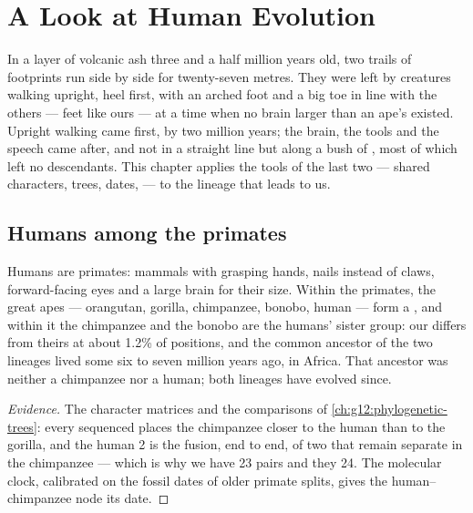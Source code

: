 \chapter{A Look at Human Evolution}\label{ch:g12:human-evolution}

In a layer of volcanic ash three and a half million years old, two
trails of footprints run side by side for twenty-seven metres. They
were left by creatures walking upright, heel first, with an arched foot
and a big toe in line with the others --- feet like ours --- at a time
when no brain larger than an ape's existed. Upright walking came
first, by two million years; the brain, the tools and the speech came
after, and not in a straight line but along a bush of , most of
which left no descendants. This chapter applies the tools of the last
two --- shared characters, trees, dates,  --- to the lineage that
leads to us.

\section{Humans among the primates}

\begin{proposition}\label{prop:g12:human-evolution:place}
Humans are primates: mammals with grasping hands, nails instead of
claws, forward-facing eyes and a large brain for their size. Within the
primates, the great apes --- orangutan, gorilla, chimpanzee, bonobo,
human --- form a , and within it the chimpanzee and the bonobo
are the humans' sister group: our  differs from theirs at about
1.2\% of positions, and the common ancestor of the two lineages lived
some six to seven million years ago, in Africa. That ancestor was
neither a chimpanzee nor a human; both lineages have evolved since.
\end{proposition}
\begin{proof}[Evidence]
The character matrices and the  comparisons of
\cref{ch:g12:phylogenetic-trees}: every  sequenced places the
chimpanzee closer to the human than to the gorilla, and the human
 2 is the fusion, end to end, of two  that
remain separate in the chimpanzee --- which is why we have 23 pairs
and they 24. The molecular clock, calibrated on the fossil dates of
older primate splits, gives the human--chimpanzee node its date.
\end{proof}

